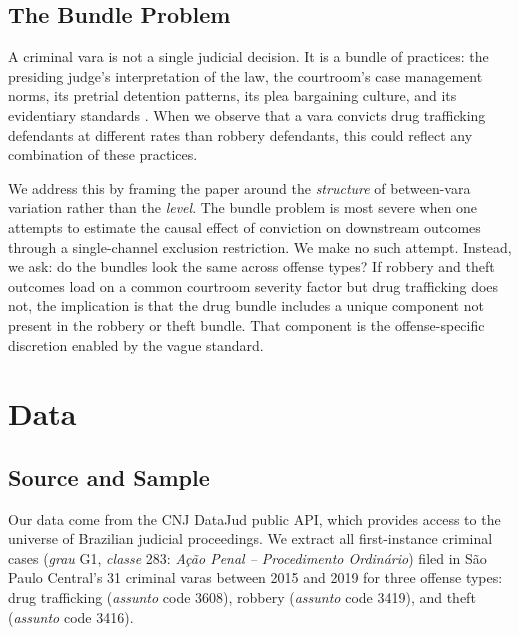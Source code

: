 \documentclass[12pt]{article}
\begin{document}
\subsection{The Bundle Problem}

A criminal vara is not a single judicial decision. It is a bundle of practices: the presiding judge's interpretation of the law, the courtroom's case management norms, its pretrial detention patterns, its plea bargaining culture, and its evidentiary standards \citep{hull2025}. When we observe that a vara convicts drug trafficking defendants at different rates than robbery defendants, this could reflect any combination of these practices.

We address this by framing the paper around the \textit{structure} of between-vara variation rather than the \textit{level}. The bundle problem is most severe when one attempts to estimate the causal effect of conviction on downstream outcomes through a single-channel exclusion restriction. We make no such attempt. Instead, we ask: do the bundles look the same across offense types? If robbery and theft outcomes load on a common courtroom severity factor but drug trafficking does not, the implication is that the drug bundle includes a unique component not present in the robbery or theft bundle. That component is the offense-specific discretion enabled by the vague standard.


\section{Data}

\subsection{Source and Sample}

Our data come from the CNJ DataJud public API, which provides access to the universe of Brazilian judicial proceedings. We extract all first-instance criminal cases (\textit{grau} G1, \textit{classe} 283: \textit{A\c{c}\~ao Penal -- Procedimento Ordin\'ario}) filed in S\~ao Paulo Central's 31 criminal varas between 2015 and 2019 for three offense types: drug trafficking (\textit{assunto} code 3608), robbery (\textit{assunto} code 3419), and theft (\textit{assunto} code 3416).
\end{document}
